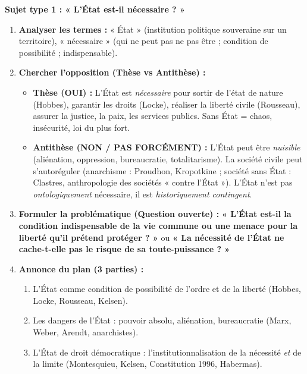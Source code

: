 \documentclass[11pt]{article}
\begin{document}
\begin{methode}
\textbf{Sujet type 1 : « L'État est-il nécessaire ? »}
\begin{enumerate}
    \item \textbf{Analyser les termes :} « État » (institution politique souveraine sur un territoire), « nécessaire » (qui ne peut pas ne pas être ; condition de possibilité ; indispensable).
    \item \textbf{Chercher l'opposition (Thèse vs Antithèse) :}
        \begin{itemize}
            \item \textbf{Thèse (OUI) :} L'État est \emph{nécessaire} pour sortir de l'état de nature (Hobbes), garantir les droits (Locke), réaliser la liberté civile (Rousseau), assurer la justice, la paix, les services publics. Sans État = chaos, insécurité, loi du plus fort.
            \item \textbf{Antithèse (NON / PAS FORCÉMENT) :} L'État peut être \emph{nuisible} (aliénation, oppression, bureaucratie, totalitarisme). La société civile peut s'autoréguler (anarchisme : Proudhon, Kropotkine ; société sans État : Clastres, anthropologie des sociétés « contre l'État »). L'État n'est pas \emph{ontologiquement} nécessaire, il est \emph{historiquement contingent}.
        \end{itemize}
    \item \textbf{Formuler la problématique (Question ouverte) :} \textbf{« L'État est-il la condition indispensable de la vie commune ou une menace pour la liberté qu'il prétend protéger ? »} ou \textbf{« La nécessité de l'État ne cache-t-elle pas le risque de sa toute-puissance ? »}
    \item \textbf{Annonce du plan (3 parties) :}
        \begin{enumerate}
            \item L'État comme condition de possibilité de l'ordre et de la liberté (Hobbes, Locke, Rousseau, Kelsen).
            \item Les dangers de l'État : pouvoir absolu, aliénation, bureaucratie (Marx, Weber, Arendt, anarchistes).
            \item L'État de droit démocratique : l'institutionnalisation de la nécessité \emph{et} de la limite (Montesquieu, Kelsen, Constitution 1996, Habermas).
        \end{enumerate}
\end{enumerate}


\end{methode}
\end{document}
